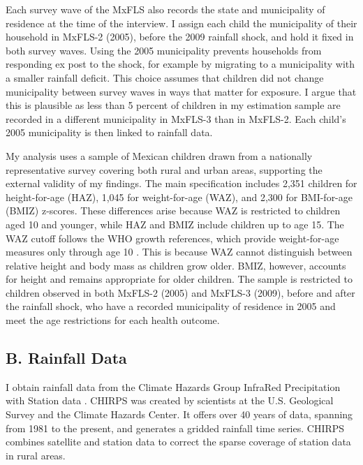 \documentclass[12pt]{article}
\begin{document}
Each survey wave of the MxFLS also records the state and municipality of residence at the time of the interview. I assign each child the municipality of their household in MxFLS-2 (2005), before the 2009 rainfall shock, and hold it fixed in both survey waves. Using the 2005 municipality prevents households from responding ex post to the shock, for example by migrating to a municipality with a smaller rainfall deficit. This choice assumes that children did not change municipality between survey waves in ways that matter for exposure. I argue that this is plausible as less than 5 percent of children in my estimation sample are recorded in a different municipality in MxFLS-3 than in MxFLS-2. Each child's 2005 municipality is then linked to rainfall data.

My analysis uses a sample of Mexican children drawn from a nationally representative survey covering both rural and urban areas, supporting the external validity of my findings. The main specification includes 2,351 children for height-for-age (HAZ), 1,045 for weight-for-age (WAZ), and 2,300 for BMI-for-age (BMIZ) z-scores. These differences arise because WAZ is restricted to children aged 10 and younger, while HAZ and BMIZ include children up to age 15. The WAZ cutoff follows the WHO growth references, which provide weight-for-age measures only through age 10 \parencite{deonisDevelopmentWHOGrowth2007}. This is because WAZ cannot distinguish between relative height and body mass as children grow older. BMIZ, however, accounts for height and remains appropriate for older children. The sample is restricted to children observed in both MxFLS-2 (2005) and MxFLS-3 (2009), before and after the rainfall shock, who have a recorded municipality of residence in 2005 and meet the age restrictions for each health outcome.

\subsection*{B. Rainfall Data}

I obtain rainfall data from the Climate Hazards Group InfraRed Precipitation with Station data \parencite[CHIRPS;][]{funkClimateHazardsInfrared2015}. CHIRPS was created by scientists at the U.S. Geological Survey and the Climate Hazards Center. It offers over 40 years of data, spanning from 1981 to the present, and generates a gridded rainfall time series. CHIRPS combines satellite and station data to correct the sparse coverage of station data in rural areas.
\end{document}
